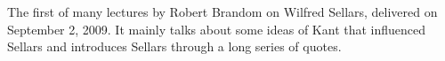 The first of many lectures by Robert Brandom on Wilfred Sellars, delivered on September 2, 2009. It mainly talks about some ideas of Kant that influenced Sellars and introduces Sellars through a long series of quotes.
